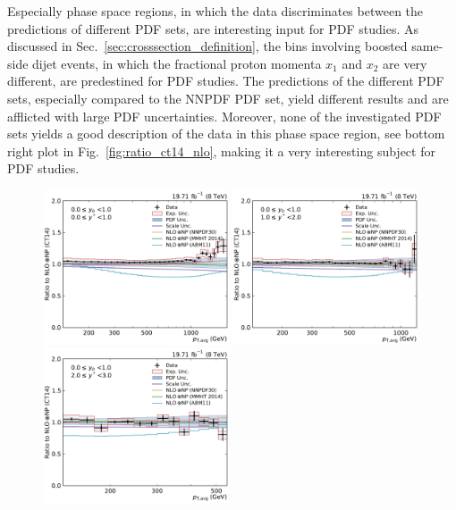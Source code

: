 Especially phase space regions, in which the data discriminates between the
predictions of different PDF sets, are interesting input for PDF studies. As
discussed in Sec.~\ref{sec:crosssection_definition}, the bins involving boosted
same-side dijet events, in which the fractional proton momenta $x_1$ and $x_2$
are very different, are predestined for PDF studies. The predictions of the
different PDF sets, especially compared to the NNPDF PDF set, yield different
results and are afflicted with large PDF uncertainties. Moreover, none of the
investigated PDF sets yields a good description of the data in this phase space
region, see bottom right plot in Fig.~\ref{fig:ratio_ct14_nlo}, making it a very
interesting subject for PDF studies.

\begin{figure}[htbp]
    \centering
    \includegraphics[width=0.49\textwidth]{figures/measurement/ratio_to_CT14nlo+np_totcomp_yb0ys0.pdf}\hfill
    \includegraphics[width=0.49\textwidth]{figures/measurement/ratio_to_CT14nlo+np_totcomp_yb0ys1.pdf}
    \includegraphics[width=0.49\textwidth]{figures/measurement/ratio_to_CT14nlo+np_totcomp_yb0ys2.pdf}\hfill

\end{figure}
